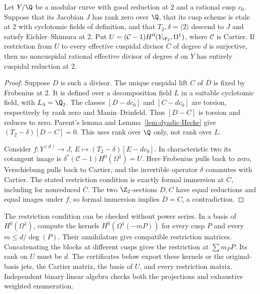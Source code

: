 \begin{lemma}\label{lem:quotient-Cartier}
Let $Y/\Q$ be a modular curve with good reduction at $2$ and a
rational cusp $c_0$. Suppose that its Jacobian $J$ has rank zero
over $\Q$, that its cusp scheme is etale at $2$ with cyclotomic
fields of definition, and that $T_2,\delta=\langle2\rangle$ descend
to $J$ and satisfy Eichler--Shimura at $2$.
Put $U=(\mathcal C-1)H^0(Y_{\F_2},\Omega^1)$, where $\mathcal C$
is Cartier. If restriction from $U$ to every effective cuspidal
divisor $\overline C$ of degree $d$ is surjective, then no
noncuspidal rational effective divisor of degree $d$ on $Y$
has entirely cuspidal reduction at $2$.
\end{lemma}
\begin{proof}
Suppose $D$ is such a divisor. The unique cuspidal lift $C$ of
$\overline D$ is fixed by Frobenius at $2$. It is defined over a
decomposition field $L$ in a suitable cyclotomic field, with
$L_\lambda=\Q_2$. The classes $[D-dc_0]$ and $[C-dc_0]$ are
torsion, respectively by rank zero and Manin--Drinfeld.
Thus $[D-C]$ is torsion and reduces to zero. Parent's lemma and
Lemma~\ref{lem:dyadic-Hecke} give
$(T_2-\delta)[D-C]=0$.
This uses rank over $\Q$ only, not rank over $L$.

Consider $f:Y^{(d)}\to J$, $E\mapsto(T_2-\delta)[E-dc_0]$.
In characteristic two its cotangent image is
$\delta^*(\mathcal C-1)H^0(\Omega^1)=U$.
Here Frobenius pulls back to zero, Verschiebung pulls back to
Cartier, and the invertible operator $\delta$ commutes with Cartier.
The stated restriction condition is exactly formal immersion at
$\overline C$, including for nonreduced $\overline C$.
The two $\Z_2$-sections $D,C$ have equal reductions and equal
images under $f$, so formal immersion implies $D=C$, a contradiction.
\end{proof}

The restriction condition can be checked without power series.
In a basis of $H^0(\Omega^1)$, compute the kernels
$H^0(\Omega^1(-mP))$ for every cusp $P$ and every
$m\leq d/\deg(P)$. Their annihilators give compatible restriction
matrices. Concatenating the blocks at different cusps gives the
restriction at $\sum m_P P$. Its rank on $U$ must be $d$.
The certificates below export these kernels or the original-basis
jets, the Cartier matrix, the basis of $U$, and every restriction
matrix. Independent binary linear algebra checks both the
projections and exhaustive weighted enumeration.
